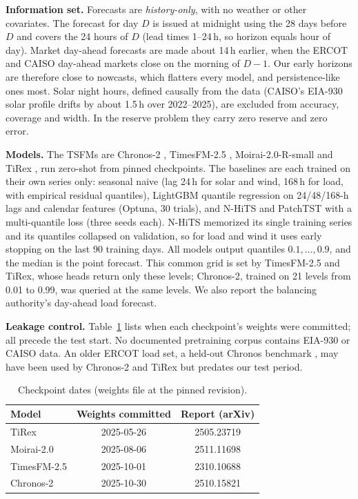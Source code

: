 \documentclass[conference]{IEEEtran}
\begin{document}
\textbf{Information set.} Forecasts are \emph{history-only}, with no weather or other covariates. The forecast for day $D$ is issued at midnight using the 28 days before $D$ and covers the 24 hours of $D$ (lead times 1--24\,h, so horizon equals hour of day). Market day-ahead forecasts are made about 14\,h earlier, when the ERCOT and CAISO day-ahead markets close on the morning of $D-1$. Our early horizons are therefore close to nowcasts, which flatters every model, and persistence-like ones most. Solar night hours, defined causally from the data (CAISO's EIA-930 solar profile drifts by about 1.5\,h over 2022--2025), are excluded from accuracy, coverage and width. In the reserve problem they carry zero reserve and zero error.

\textbf{Models.} The TSFMs are Chronos-2 \cite{ansari2025chronos2}, TimesFM-2.5 \cite{das2024timesfm}, Moirai-2.0-R-small \cite{liu2025moirai2} and TiRex \cite{auer2025tirex}, run zero-shot from pinned checkpoints. The baselines are each trained on their own series only: seasonal naive (lag 24\,h for solar and wind, 168\,h for load, with empirical residual quantiles), LightGBM quantile regression \cite{ke2017lightgbm} on 24/48/168-h lags and calendar features (Optuna, 30 trials), and N-HiTS \cite{challu2023nhits} and PatchTST \cite{nie2023patchtst} with a multi-quantile loss (three seeds each). N-HiTS memorized its single training series and its quantiles collapsed on validation, so for load and wind it uses early stopping on the last 90 training days. All models output quantiles $0.1,\dots,0.9$, and the median is the point forecast. This common grid is set by TimesFM-2.5 and TiRex, whose heads return only these levels; Chronos-2, trained on 21 levels from 0.01 to 0.99, was queried at the same levels. We also report the balancing authority's day-ahead load forecast.

\textbf{Leakage control.} Table~\ref{tab:ckpt} lists when each checkpoint's weights were committed; all precede the test start. No documented pretraining corpus contains EIA-930 or CAISO data. An older ERCOT load set, a held-out Chronos benchmark \cite{ansari2024chronos}, may have been used by Chronos-2 and TiRex but predates our test period.

\begin{table}[t]
\caption{Checkpoint dates (weights file at the pinned revision).}
\label{tab:ckpt}
\centering\footnotesize
\begin{tabular}{lcc}
\toprule
Model & Weights committed & Report (arXiv) \\
\midrule
TiRex & 2025-05-26 & 2505.23719 \\
Moirai-2.0 & 2025-08-06 & 2511.11698 \\
TimesFM-2.5 & 2025-10-01 & 2310.10688 \\
Chronos-2 & 2025-10-30 & 2510.15821 \\
\bottomrule
\end{tabular}
\end{table}
\end{document}
